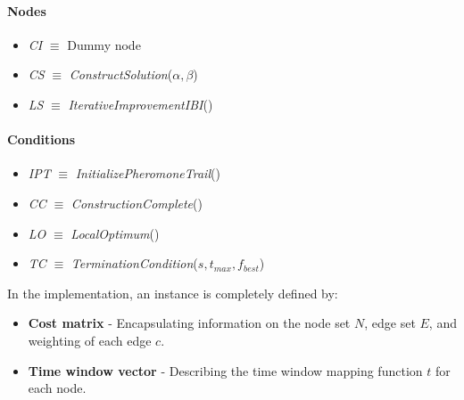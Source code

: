 \begin{homeworkProblem}
\begin{center}
\begin{minipage}{.45\textwidth}
\end{minipage}%
\hspace{1.5cm}
\begin{minipage}{.45\textwidth}
\centering
\paragraph{Nodes}
\begin{itemize}
  \item \emph{CI} $\equiv$ Dummy node
  \item \emph{CS} $\equiv$ \emph{ConstructSolution}($\alpha,\beta$)
  \item \emph{LS} $\equiv$ \emph{IterativeImprovementIBI}()
\end{itemize}
\paragraph{Conditions}
\begin{itemize}
  \item \emph{IPT} $\equiv$ \emph{InitializePheromoneTrail}()
  \item \emph{CC} $\equiv$ \emph{ConstructionComplete}()
  \item \emph{LO} $\equiv$ \emph{LocalOptimum}()
  \item \emph{TC} $\equiv$ \emph{TerminationCondition}($s,t_{max},f_{best}$)
\end{itemize}
\end{minipage}
\end{center}

\newpage
In the implementation, an instance is completely defined by:
\begin{itemize}
\item \textbf{Cost matrix} - Encapsulating information on the node set $N$, edge set $E$, and weighting of each edge $c$.
\item \textbf{Time window vector} - Describing the time window mapping function $t$ for each node.
\end{itemize}


\end{homeworkProblem}
